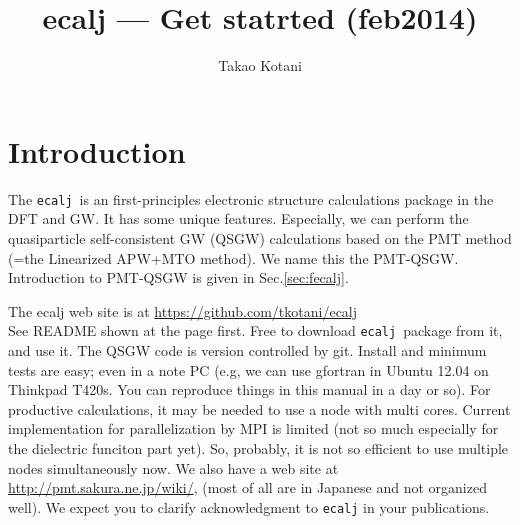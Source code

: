 \documentclass[a4paper,10pt,epsf,fleqn]{article}
\author{Takao Kotani}
\title{ecalj --- Get statrted (feb2014)}
\def\ecalj{\texttt{ecalj}}
\begin{document}
\maketitle
\tableofcontents
\newcommand{\bfr}{{\bf r}}


\newpage
\section{Introduction}
The \ecalj\ is an first-principles electronic 
structure calculations package in the DFT and GW. It has some unique features.
Especially, we can perform the quasiparticle self-consistent GW (QSGW) \cite{kotani2007a}
calculations based on the PMT method (=the Linearized APW+MTO method). 
We name this the PMT-QSGW. 
Introduction to PMT-QSGW is given in Sec.\ref{sec:fecalj}. 


The ecalj web site is at \url{https://github.com/tkotani/ecalj}\\
See README shown at the page first. Free to download \ecalj\
package from it, and use it.
The QSGW code is version controlled by git. 
Install and minimum tests are easy; even in a note PC
(e.g, we can use gfortran in Ubuntu 12.04 on Thinkpad T420s.
 You can reproduce things in this manual in a day or so). 
For productive calculations, it may be needed to use a node with
multi cores. Current implementation for parallelization by MPI is limited
(not so much especially for the dielectric funciton part yet). 
So, probably, it is not so efficient to use multiple nodes
simultaneously now. 
We also have a web site at \url{http://pmt.sakura.ne.jp/wiki/}, 
(most of all are in Japanese and not organized well).
We expect you to clarify acknowledgment to \texttt{ecalj} 
in your publications.
\end{document}
